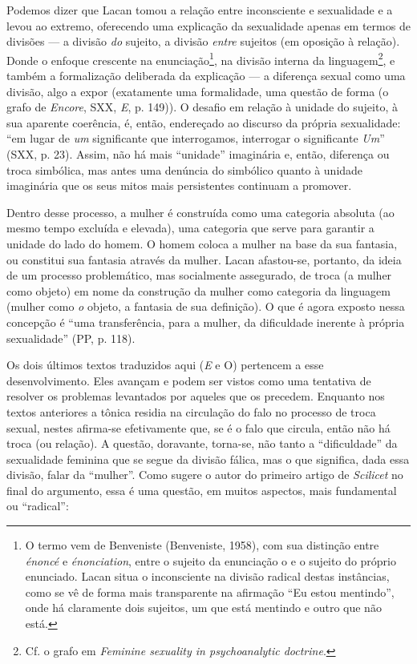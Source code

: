 Podemos dizer que Lacan tomou a relação entre inconsciente e sexualidade
e a levou ao extremo, oferecendo uma explicação da sexualidade apenas em
termos de divisões --- a divisão \emph{do} sujeito, a divisão
\emph{entre} sujeitos (em oposição à relação). Donde o enfoque crescente
na enunciação\footnote{O termo vem de Benveniste (Benveniste, 1958), com
  sua distinção entre \emph{énoncé} e \emph{énonciation}, entre o
  sujeito da enunciação o e o sujeito do próprio enunciado. Lacan situa
  o inconsciente na divisão radical destas instâncias, como se vê de
  forma mais transparente na afirmação ``Eu estou mentindo'', onde há
  claramente dois sujeitos, um que está mentindo e outro que não está.},
na divisão interna da linguagem\footnote{Cf. o grafo em \emph{Feminine
  sexuality in psychoanalytic doctrine}.}, e também a formalização
deliberada da explicação --- a diferença sexual como uma divisão, algo a
expor (exatamente uma formalidade, uma questão de forma (o grafo de
\emph{Encore}, SXX, \emph{E}, p. 149)). O desafio em relação à unidade
do sujeito, à sua aparente coerência, é, então, endereçado ao discurso
da própria sexualidade: ``em lugar de \emph{um} significante que
interrogamos, interrogar o significante \emph{Um}'' (SXX, p. 23). Assim,
não há mais ``unidade'' imaginária e, então, diferença ou troca
simbólica, mas antes uma denúncia do simbólico quanto à unidade
imaginária que os seus mitos mais persistentes continuam a promover.

Dentro desse processo, a mulher é construída como uma categoria absoluta
(ao mesmo tempo excluída e elevada), uma categoria que serve para
garantir a unidade do lado do homem. O homem coloca a mulher na base da
sua fantasia, ou constitui sua fantasia através da mulher. Lacan
afastou-se, portanto, da ideia de um processo problemático, mas
socialmente assegurado, de troca (a mulher como objeto) em nome da
construção da mulher como categoria da linguagem (mulher como \emph{o}
objeto, a fantasia de sua definição). O que é agora exposto nessa
concepção é ``uma transferência, para a mulher, da dificuldade inerente
à própria sexualidade'' (PP, p. 118).

Os dois últimos textos traduzidos aqui (\emph{E} e O) pertencem a esse
desenvolvimento. Eles avançam e podem ser vistos como uma tentativa de
resolver os problemas levantados por aqueles que os precedem. Enquanto
nos textos anteriores a tônica residia na circulação do falo no processo
de troca sexual, nestes afirma-se efetivamente que, se é o falo que
circula, então não há troca (ou relação). A questão, doravante,
torna-se, não tanto a ``dificuldade'' da sexualidade feminina que se
segue da divisão fálica, mas o que significa, dada essa divisão, falar
da ``mulher''. Como sugere o autor do primeiro artigo de \emph{Scilicet}
no final do argumento, essa é uma questão, em muitos aspectos, mais
fundamental ou ``radical'':

